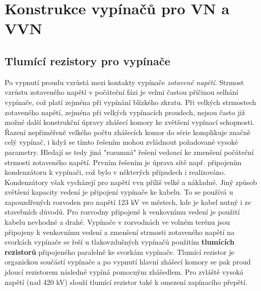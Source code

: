 \setchaptertoc
\chapter{Konstrukce vypínačů pro VN a VVN}


  \section{Tlumící rezistory pro vypínače}
    Po vypnutí proudu vzrůstá mezi kontakty vypínače \emph{zotavené napětí}. Strmost vzrůstu
    zotaveného napětí v počáteční fázi je velmi častou příčinou selhání vypínače, což platí zejména
    při vypínání blízkého zkratu. Při velkých strmostech zotaveného napětí, zejména při velkých
    vypínacích proudech, nejsou často již možné další konstrukční úpravy zhášecí komory ke zvětšení
    vypínací schopnosti. Řazení nepřiměřeně velkého počtu zhášecích komor do série komplikuje značně
    celý vypínač, i když se tímto řešením mohou zvládnout požadované vysoké parametry. Hledají se
    tedy jiná "rozumná" řešení vedoucí ke zmenšení počáteční strmosti zotaveného napětí. Prvním
    řešením je úprava sítě např. připojením kondenzátoru k vypínači, což bylo v některých případech
    i realizováno. Kondenzátory však vycházejí pro napětí vvn příliš velké a nákladné. Jiný způsob
    zvětšení kapacity vedení je připojení vypínače ke kabelu. To se používá u zapouzdřených rozvoden
    pro napětí 123 kV ve městech, kde je kabel nutný i ze stavebních důvodů. Pro rozvodny připojené
    k venkovnímu vedení je použití kabelu nevhodné a drahé. Vypínače v rozvodnách ve volném terénu
    jsou připojeny k venkovnímu vedení a zmenšení strmosti zotaveného napětí na svorkách vypínače se
    řeší u tlakovzdušných vypínačů použitím \textbf{tlumících rezistorů} připojeného paralelně ke
    svorkám vypínače. Tlumící rezistor je organickou součástí vypínače a po vypnutí hlavní zhášecí
    komory se pak proud jdoucí rezistorem následně vypíná pomocným zhášedlem. Pro zvláště vysoká
    napětí (nad 420 kV) slouží tlumící rezistor také k omezení zapínacího přepětí.

